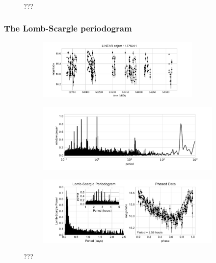 \begin{figure}[H]
\begin{subfigure}{.45\textwidth}
        \end{subfigure}
        \caption{???}
        \label{2.4a}
        \end{figure}
        
            \subsubsection{The Lomb-Scargle periodogram}

            \begin{figure}[H]
            \centering
            \begin{subfigure}{.5\textwidth}
                \centering
                \includegraphics[width=0.88\textwidth]{report/images/chap2_foundations/fig01_LINEAR_data.pdf}
                \vspace{1em}
            \end{subfigure}%
            \begin{subfigure}{.5\textwidth}
                \centering
                \includegraphics[width=\textwidth]{report/images/chap2_foundations/fig14_LINEAR_window.pdf}
            \end{subfigure}
            \begin{subfigure}{\textwidth}
                \centering
                \includegraphics[width=\textwidth]{report/images/chap2_foundations/fig02_LINEAR_PSD.pdf}
            \end{subfigure}%
            \caption{???}
            \label{2.4b}
            \end{figure}
            
